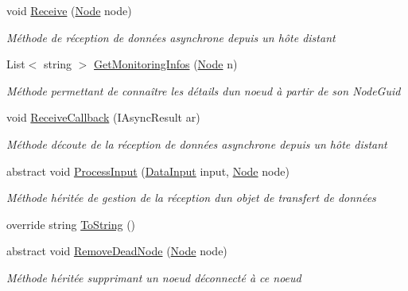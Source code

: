 \begin{DoxyCompactItemize}
void \hyperlink{class_node_net_1_1_network_1_1_nodes_1_1_node_abbeae4cb15af4c3a2608f71c317cb701}{Receive} (\hyperlink{class_node_net_1_1_network_1_1_nodes_1_1_node}{Node} node)
\begin{DoxyCompactList}\small\item\em Méthode de réception de données asynchrone depuis un hôte distant \end{DoxyCompactList}\item 
List$<$ string $>$ \hyperlink{class_node_net_1_1_network_1_1_nodes_1_1_node_a9d07bf5dae221854d15c1d6fc33cbb9c}{Get\+Monitoring\+Infos} (\hyperlink{class_node_net_1_1_network_1_1_nodes_1_1_node}{Node} n)
\begin{DoxyCompactList}\small\item\em Méthode permettant de connaître les détails d\textquotesingle{}un noeud à partir de son Node\+Guid \end{DoxyCompactList}\item 
void \hyperlink{class_node_net_1_1_network_1_1_nodes_1_1_node_ae0c6ccdbbcc7dbc30b4a30b63e878365}{Receive\+Callback} (I\+Async\+Result ar)
\begin{DoxyCompactList}\small\item\em Méthode d\textquotesingle{}écoute de la réception de données asynchrone depuis un hôte distant \end{DoxyCompactList}\item 
abstract void \hyperlink{class_node_net_1_1_network_1_1_nodes_1_1_node_a953dce3f4779355cd3bf542ac6d1d3d8}{Process\+Input} (\hyperlink{class_node_net_1_1_data_1_1_data_input}{Data\+Input} input, \hyperlink{class_node_net_1_1_network_1_1_nodes_1_1_node}{Node} node)
\begin{DoxyCompactList}\small\item\em Méthode héritée de gestion de la réception d\textquotesingle{}un objet de transfert de données \end{DoxyCompactList}\item 
override string \hyperlink{class_node_net_1_1_network_1_1_nodes_1_1_node_ad290fbf0c7caa852c585e526e86ad86f}{To\+String} ()
\item 
abstract void \hyperlink{class_node_net_1_1_network_1_1_nodes_1_1_node_a790d3239a1f0f8442450c060c015f9f3}{Remove\+Dead\+Node} (\hyperlink{class_node_net_1_1_network_1_1_nodes_1_1_node}{Node} node)
\begin{DoxyCompactList}\small\item\em Méthode héritée supprimant un noeud déconnecté à ce noeud \end{DoxyCompactList}\end{DoxyCompactItemize}
